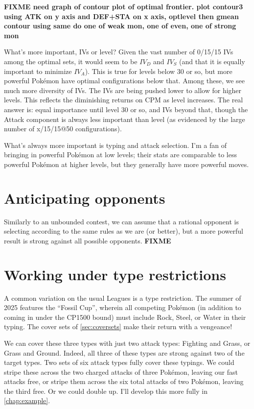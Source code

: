 \textbf{FIXME need graph of contour plot of optimal frontier.
plot contour3 using ATK on y axis and DEF+STA on x axis, optlevel
then gmean contour using same
do one of weak mon, one of even, one of strong mon}

What's more important, IVs or level?
Given the vast number of 0/15/15 IVs among the optimal sets, it
  would seem to be $IV_D$ and $IV_S$ (and that it is equally
  important to minimize $IV_A$).
This is true for levels below 30 or so, but more powerful Pokémon
  have optimal configurations below that.
Among these, we see much more diversity of IVs.
The IVs are being pushed lower to allow for higher levels.
This reflects the diminishing returns on CPM as level increases.
The real answer is: equal importance until level 30 or so, and IVs beyond that,
  though the Attack component is always less important than level
  (as evidenced by the large number of x/15/15@50 configurations).

What's always more important is typing and attack selection.
I'm a fan of bringing in powerful Pokémon at low levels; their stats are
  comparable to less powerful Pokémon at higher levels, but they
  generally have more powerful moves.

\section{Anticipating opponents}
Similarly to an unbounded contest, we can assume that a rational opponent is selecting
  according to the same rules as we are (or better), but a more powerful result is
  strong against all possible opponents.
\textbf{FIXME}

\section{Working under type restrictions}
\label{sec:typeleagues}
A common variation on the usual Leagues is a type restriction.
The summer of 2025 features the ``Fossil Cup'', wherein all competing
  Pokémon (in addition to coming in under the CP1500 bound)
  must include Rock, Steel, or Water in their typing.
The cover sets of \autoref{sec:coversets} make their return with a vengeance!

We can cover these three types with just two attack types: Fighting and Grass, or Grass and Ground.
Indeed, all three of these types are strong against two of the target types.
Two sets of six attack types fully cover these typings.
We could stripe these across the two charged attacks of three Pokémon,
  leaving our fast attacks free, or stripe them across the six total
  attacks of two Pokémon, leaving the third free.
Or we could double up.
I'll develop this more fully in \autoref{chap:example}.

